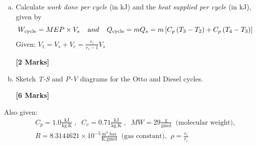 \documentclass[calculator,steamtables,refrigeranttables,psychrometricchart,datasheet,sample]{exam}
\newcommand{\frc}{\displaystyle\frac}
\begin{document}
\begin{question}
\begin{enumerate}[(a)]
\item Calculate {\it work done per cycle} (in kJ) and the {\it heat supplied per cycle} (in kJ), given by
\begin{displaymath}
W_{\text{cycle}} = MEP \times V_{s} \;\;\;\;{\text and } \;\;\;\; Q_{\text{cycle}} = m Q_{s} = m \left[ C_{p}\left(T_{3}-T_{2}\right) + C_{p}\left(T_{4}-T_{3}\right)\right]  
\end{displaymath}
Given: $V_{1}=V_{s}+V_{c}=\frc{r_{c}}{r_{c}-1}V_{s}$
\begin{flushright}
{\bf [2 Marks]}
\end{flushright}

\item Sketch {\it T-S} and {\it P-V} diagrams for the Otto and Diesel cycles.
\begin{flushright}
{\bf [6 Marks]}
\end{flushright} 
%
\end{enumerate}

Also given: 
\begin{eqnarray}
&& C_{p}=1.0\frc{\text{kJ}}{\text{kg.K}}\;,\;\;C_{v}=0.71\frc{\text{kJ}}{\text{kg.K}}\;, \;\; MW=29 \frc{\text{g}}{\text{gmol}}\;\; \text{(molecular weight),} \nonumber \\
&& R=8.3144621\times 10^{-5}\frc{\text{m}^{3}.\text{bar}}{\text{K.gmol}}\;\;\text{(gas constant),}\;\; \rho = \frc{r_{c}}{r_{e}} \nonumber 
\end{eqnarray}

\end{question}

\clearpage
\end{document}

